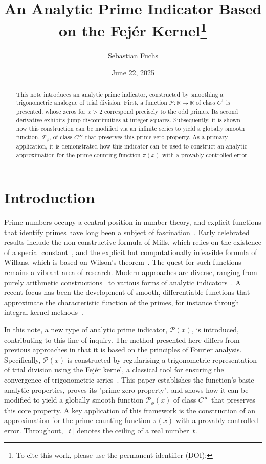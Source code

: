 \documentclass[11pt,a4paper]{amsart}
\title[An Analytic Prime Indicator]{An Analytic Prime Indicator Based on the Fejér Kernel\thanks{To cite this work, please use the permanent identifier (DOI): \doi{10.5281/zenodo.15712807}}}
\author{Sebastian Fuchs}
\date{June 22, 2025}
\newcommand{\Px}{\mathcal{P}}
\newcommand{\R}{\mathbb{R}}
\theoremstyle{plain}
\theoremstyle{definition}
\begin{document}
\begin{abstract}
This note introduces an analytic prime indicator, constructed by smoothing a trigonometric analogue of trial division. First, a function $\Px\colon\R\to\R$ of class $C^1$ is presented, whose zeros for $x>2$ correspond precisely to the odd primes. Its second derivative exhibits jump discontinuities at integer squares. Subsequently, it is shown how this construction can be modified via an infinite series to yield a globally smooth function, $\Px_{\phi}$, of class $C^\infty$ that preserves this prime-zero property. As a primary application, it is demonstrated how this indicator can be used to construct an analytic approximation for the prime-counting function $\pi(x)$ with a provably controlled error.
\end{abstract}

\maketitle

\section{Introduction}
Prime numbers occupy a central position in number theory, and explicit functions that identify primes have long been a subject of fascination~\cite{hardy2008}. Early celebrated results include the non-constructive formula of Mills, which relies on the existence of a special constant~\cite{mills1947}, and the explicit but computationally infeasible formula of Willans, which is based on Wilson's theorem~\cite{willans1964}.
The quest for such functions remains a vibrant area of research. Modern approaches are diverse, ranging from purely arithmetic constructions~\cite{mazzanti2024} to various forms of analytic indicators~\cite{helfgott2023, hiary2018, seriprim2022}. A recent focus has been the development of smooth, differentiable functions that approximate the characteristic function of the primes, for instance through integral kernel methods~\cite{semenov2025}.

In this note, a new type of analytic prime indicator, $\Px(x)$, is introduced, contributing to this line of inquiry. The method presented here differs from previous approaches in that it is based on the principles of Fourier analysis. Specifically, $\Px(x)$ is constructed by regularising a trigonometric representation of trial division using the Fejér kernel, a classical tool for ensuring the convergence of trigonometric series~\cite{zygmund2002}.
This paper establishes the function's basic analytic properties, proves its "prime-zero property", and shows how it can be modified to yield a globally smooth function $\Px_{\phi}(x)$ of class $C^\infty$ that preserves this core property. A key application of this framework is the construction of an approximation for the prime-counting function $\pi(x)$ with a provably controlled error. Throughout, $\lceil t \rceil$ denotes the ceiling of a real number~$t$.
\end{document}
